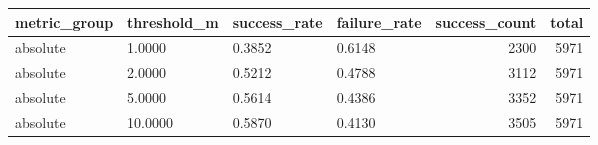 \begin{tabular}{llllrr}
\toprule
metric_group & threshold_m & success_rate & failure_rate & success_count & total \\
\midrule
absolute & 1.0000 & 0.3852 & 0.6148 & 2300 & 5971 \\
absolute & 2.0000 & 0.5212 & 0.4788 & 3112 & 5971 \\
absolute & 5.0000 & 0.5614 & 0.4386 & 3352 & 5971 \\
absolute & 10.0000 & 0.5870 & 0.4130 & 3505 & 5971 \\
\bottomrule
\end{tabular}
